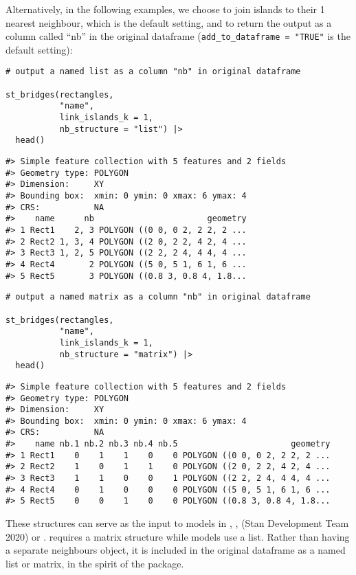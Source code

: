 Alternatively, in the following examples, we choose to join islands to their 1 nearest
neighbour, which is the default setting, and to return the output as a column called ``nb'' in the original
 dataframe (\texttt{add\_to\_dataframe\ =\ "TRUE"} is the default setting):

\begin{verbatim}
# output a named list as a column "nb" in original dataframe

st_bridges(rectangles, 
           "name", 
           link_islands_k = 1, 
           nb_structure = "list") |> 
  head()
\end{verbatim}

\begin{verbatim}
#> Simple feature collection with 5 features and 2 fields
#> Geometry type: POLYGON
#> Dimension:     XY
#> Bounding box:  xmin: 0 ymin: 0 xmax: 6 ymax: 4
#> CRS:           NA
#>    name      nb                       geometry
#> 1 Rect1    2, 3 POLYGON ((0 0, 0 2, 2 2, 2 ...
#> 2 Rect2 1, 3, 4 POLYGON ((2 0, 2 2, 4 2, 4 ...
#> 3 Rect3 1, 2, 5 POLYGON ((2 2, 2 4, 4 4, 4 ...
#> 4 Rect4       2 POLYGON ((5 0, 5 1, 6 1, 6 ...
#> 5 Rect5       3 POLYGON ((0.8 3, 0.8 4, 1.8...
\end{verbatim}

\begin{verbatim}
# output a named matrix as a column "nb" in original dataframe

st_bridges(rectangles, 
           "name", 
           link_islands_k = 1, 
           nb_structure = "matrix") |> 
  head()
\end{verbatim}

\begin{verbatim}
#> Simple feature collection with 5 features and 2 fields
#> Geometry type: POLYGON
#> Dimension:     XY
#> Bounding box:  xmin: 0 ymin: 0 xmax: 6 ymax: 4
#> CRS:           NA
#>    name nb.1 nb.2 nb.3 nb.4 nb.5                       geometry
#> 1 Rect1    0    1    1    0    0 POLYGON ((0 0, 0 2, 2 2, 2 ...
#> 2 Rect2    1    0    1    1    0 POLYGON ((2 0, 2 2, 4 2, 4 ...
#> 3 Rect3    1    1    0    0    1 POLYGON ((2 2, 2 4, 4 4, 4 ...
#> 4 Rect4    0    1    0    0    0 POLYGON ((5 0, 5 1, 6 1, 6 ...
#> 5 Rect5    0    0    1    0    0 POLYGON ((0.8 3, 0.8 4, 1.8...
\end{verbatim}

These structures can serve as the input to models in ,
,  (Stan Development Team 2020) or .  requires a matrix structure while  models use a list. Rather than having a separate neighbours
object, it is included in the original  dataframe as a named list or matrix, in the spirit of the  package.

